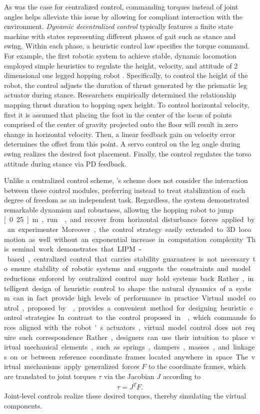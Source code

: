 As was the case for centralized control, commanding torques instead of joint
angles helps alleviate this issue by allowing for compliant interaction with the
environment. \emph{Dynamic decentralized control} typically features a finite
state machine with states representing different phases of gait such as stance
and swing. Within each phase, a heuristic control law specifies the torque
command. For example, the first robotic system to achieve stable, dynamic
locomotion employed simple heuristics to regulate the height, velocity, and
attitude of 2 dimensional one legged hopping robot
\citep{raibert1983dynamically}. Specifically, to control the height of the
robot, the control adjusts the duration of thrust generated by the prismatic leg
actuator during stance. Researchers empirically determined the relationship
mapping thrust duration to hopping apex height. To control horizontal velocity,
first it is assumed that placing the foot in the center of the locus of points
comprised of the center of gravity projected onto the floor will result in zero
change in horizontal velocity. Then, a linear feedback gain on velocity error
determines the offset from this point. A servo control on the leg angle during
swing realizes the desired foot placement. Finally, the control regulates the
torso attitude during stance via PD feedback. 

Unlike a centralized control scheme, \citeauthor{raibert1983dynamically}'s
scheme does not consider the interaction between these control modules,
preferring instead to treat stabilization of each degree of freedom as an
independent task. Regardless, the system demonstrated remarkable dynamism and
robustness, allowing the hopping robot to jump \unit[0.25]{m}, run
, and recover from horizontal disturbance forces applied by
an experimenter. Moreover, the control strategy easily extended to 3D locomotion
as well without an exponential increase in computation complexity. This seminal
work demonstrates that LIPM-based, centralized control that carries stability
guarantees is not necessary to ensure stability of robotic systems and suggests
the constraints and model reductions enforced by centralized control may hold
systems back. Rather, intelligent design of heuristic control to shape the
natural dynamics of a system can in fact provide high levels of performance in
practice.

Virtual model control, proposed by \citet{pratt2001virtual}, provides a
convenient method for designing heuristic control strategies. In contrast to the
control proposed in \citet{raibert1983dynamically}, which commands forces
aligned with the robot's actuators, virtual model control does not require such
correspondence. Rather, designers can use their intuition to place virtual
mechanical elements, such as springs, dampers, masses, and linkages on or
between reference coordinate frames located anywhere in space. The virtual
mechanisms apply generalized forces $F$ to the coordinate frames, which are
translated to joint torques $\tau$ via the Jacobian $J$ according to
\begin{align}
    \tau = J^T F.
\end{align}
Joint-level controls realize these desired torques, thereby simulating the
virtual components. 

